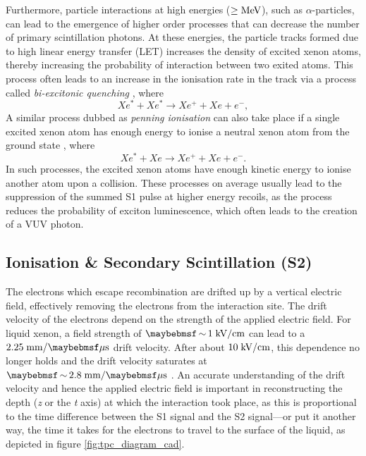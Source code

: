 Furthermore, particle interactions at high energies ($\geq{}\text{MeV}$), such as $\alpha$-particles, can lead to the emergence of higher order processes that can decrease the number of primary scintillation photons. At these energies, the particle tracks formed due to high linear energy transfer (LET) increases the density of excited xenon atoms, thereby increasing the probability of interaction between two exited atoms. This process often leads to an increase in the ionisation rate in the track via a process called \textit{bi-excitonic quenching} \cite{bi_excitonic}, where
%
\begin{equation} \label{eq:bi-excitonic_quenching}
    Xe^{\ast} + Xe^{\ast} \rightarrow Xe^{+} + Xe + e^{-},
\end{equation} 
%
A similar process dubbed as \textit{penning ionisation} can also take place if a single excited xenon atom has enough energy to ionise a neutral xenon atom from the ground state
\cite{Dahl}, where
%
\begin{equation} \label{eq:bi-excitonic_quenching}
    Xe^{\ast} + Xe \rightarrow Xe^{+} + Xe + e^{-}.
\end{equation} 
%
In such processes, the excited xenon atoms have enough kinetic energy to ionise another atom upon a collision. These processes on average usually lead to the suppression of the summed S1 pulse at higher energy recoils, as the process reduces the probability of exciton luminescence, which often leads to the creation of a VUV photon.


\subsection{Ionisation \& Secondary Scintillation (S2)}
\label{subsec:s2}

The electrons which escape recombination are drifted up by a vertical electric field, effectively removing the electrons from the interaction site. The drift velocity of the electrons depend on the strength of the applied electric field. For liquid xenon, a field strength of $\sim 1 \; \MathText{kV/cm}$ can lead to a $2.25 \; \MathText{mm/\mu{}s}$ drift velocity. After about $10 \; \text{kV/cm}$, this dependence no longer holds and the drift velocity saturates at $\sim2.8 \; \MathText{mm/\mu{}s}$ \cite{e_drift}. An accurate understanding of the drift velocity and hence the applied electric field is important in reconstructing the depth (\textit{z} or the \textit{t} axis) at which the interaction took place, as this is proportional to the time difference between the S1 signal and the S2 signal---or put it another way, the time it takes for the electrons to travel to the surface of the liquid, as depicted in figure \ref{fig:tpc_diagram_cad}.

